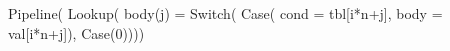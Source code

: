 \begin{juliacode}
Pipeline(
  Lookup(
    body(j) = Switch(
      Case(
        cond = tbl[i*n+j],
        body = val[i*n+j]),
      Case(0))))
\end{juliacode}